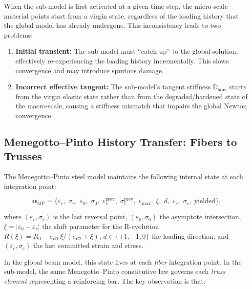 When the sub-model is first activated at a given time step, the
micro-scale material points start from a virgin state, regardless of
the loading history that the global model has already undergone.
This inconsistency leads to two problems:

\begin{enumerate}
  \item \textbf{Initial transient:}  The sub-model must ``catch up''
    to the global solution, effectively re-experiencing the loading
    history incrementally.  This slows convergence and may introduce
    spurious damage.
  \item \textbf{Incorrect effective tangent:}  The sub-model's
    tangent stiffness $\mathbb{D}_{\text{hom}}$ starts from the
    virgin elastic state rather than from the degraded/hardened state
    of the macro-scale, causing a stiffness mismatch that impairs
    the global Newton convergence.
\end{enumerate}

\subsection{Menegotto--Pinto History Transfer: Fibers to Trusses}
\label{ssec:menegotto-transfer}

The Menegotto--Pinto steel model maintains the following internal
state at each integration point:

\begin{equation}
  \boldsymbol{\alpha}_{\text{MP}} = \bigl\{
    \varepsilon_r,\; \sigma_r,\;
    \varepsilon_0,\; \sigma_0,\;
    \varepsilon_r^{\text{prev}},\; \sigma_r^{\text{prev}},\;
    \varepsilon_{\max},\; \xi,\;
    d,\; \varepsilon_c,\; \sigma_c,\;
    \text{yielded}
  \bigr\},
  \label{eq:mp-state}
\end{equation}

where $(\varepsilon_r, \sigma_r)$ is the last reversal point,
$(\varepsilon_0, \sigma_0)$ the asymptote intersection,
$\xi = |\varepsilon_0 - \varepsilon_r|$ the shift parameter for the
R-evolution $R(\xi) = R_0 - c_{R1}\,\xi/(c_{R2} + \xi)$,
$d \in \{+1, -1, 0\}$ the loading direction,
and $(\varepsilon_c, \sigma_c)$ the last committed strain and stress.

In the global beam model, this state lives at each \emph{fiber}
integration point.  In the sub-model, the same Menegotto--Pinto
constitutive law governs each \emph{truss element} representing
a reinforcing bar.  The key observation is that:

